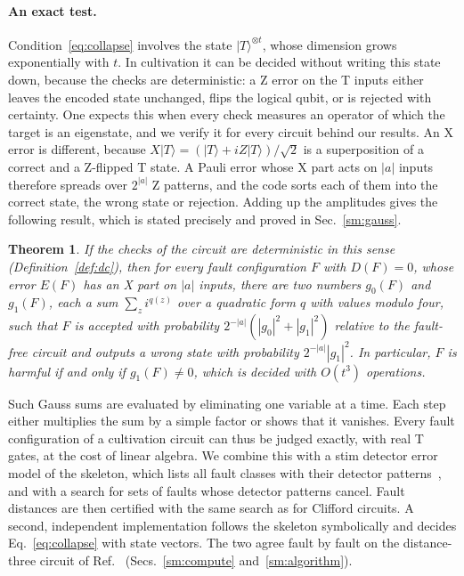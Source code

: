 \documentclass[aps,prl,reprint,twocolumn,amsmath,amssymb,floatfix,nofootinbib,superscriptaddress]{revtex4-2}
\newtheorem{theorem}{Theorem}
\theoremstyle{definition}
\theoremstyle{remark}
\begin{document}
\paragraph*{An exact test.}
Condition~\eqref{eq:collapse} involves the state $|T\rangle^{\otimes t}$, whose dimension grows exponentially with $t$. In cultivation it can be decided without writing this state down, because the checks are deterministic: a Z error on the T inputs either leaves the encoded state unchanged, flips the logical qubit, or is rejected with certainty. One expects this when every check measures an operator of which the target is an eigenstate, and we verify it for every circuit behind our results. An X error is different, because $X|T\rangle=(|T\rangle+iZ|T\rangle)/\sqrt2$ is a superposition of a correct and a Z-flipped T state. A Pauli error whose X part acts on $|a|$ inputs therefore spreads over $2^{|a|}$ Z patterns, and the code sorts each of them into the correct state, the wrong state or rejection. Adding up the amplitudes gives the following result, which is stated precisely and proved in Sec.~\ref{sm:gauss}.
\begin{theorem}\label{thm:gauss}
If the checks of the circuit are deterministic in this sense (Definition~\ref{def:dc}), then for every fault configuration $F$ with $D(F)=0$, whose error $E(F)$ has an X part on $|a|$ inputs, there are two numbers $g_0(F)$ and $g_1(F)$, each a sum $\sum_z i^{q(z)}$ over a quadratic form $q$ with values modulo four, such that $F$ is accepted with probability $2^{-|a|}(|g_0|^2+|g_1|^2)$ relative to the fault-free circuit and outputs a wrong state with probability $2^{-|a|}|g_1|^2$. In particular, $F$ is harmful if and only if $g_1(F)\neq0$, which is decided with $O(t^3)$ operations.
\end{theorem}
Such Gauss sums are evaluated by eliminating one variable at a time. Each step either multiplies the sum by a simple factor or shows that it vanishes. Every fault configuration of a cultivation circuit can thus be judged exactly, with real T gates, at the cost of linear algebra. We combine this with a stim detector error model of the skeleton, which lists all fault classes with their detector patterns~\cite{stim}, and with a search for sets of faults whose detector patterns cancel. Fault distances are then certified with the same search as for Clifford circuits. A second, independent implementation follows the skeleton symbolically and decides Eq.~\eqref{eq:collapse} with state vectors. The two agree fault by fault on the distance-three circuit of Ref.~\cite{cultivation} (Secs.~\ref{sm:compute} and~\ref{sm:algorithm}).
\end{document}
